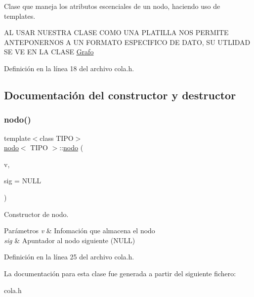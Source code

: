 Clase que maneja los atributos escenciales de un nodo, haciendo uso de templates. 

AL U\+S\+AR N\+U\+E\+S\+T\+RA C\+L\+A\+SE C\+O\+MO U\+NA P\+L\+A\+T\+I\+L\+LA N\+OS P\+E\+R\+M\+I\+TE A\+N\+T\+E\+P\+O\+N\+E\+R\+N\+OS A UN F\+O\+R\+M\+A\+TO E\+S\+P\+E\+C\+I\+F\+I\+CO DE D\+A\+TO, SU U\+T\+L\+I\+D\+AD SE VE EN LA C\+L\+A\+SE \hyperlink{classGrafo}{Grafo} 

Definición en la línea 18 del archivo cola.\+h.



\subsection{Documentación del constructor y destructor}
\mbox{\label{classnodo_ad6c42379673cc2de946e77dacace5155}} 
\subsubsection{\texorpdfstring{nodo()}{nodo()}}
{\footnotesize\ttfamily template$<$class T\+I\+PO$>$ \\
\hyperlink{classnodo}{nodo}$<$ T\+I\+PO $>$\+::\hyperlink{classnodo}{nodo} (\begin{DoxyParamCaption}\item[{T\+I\+PO}]{v,  }\item[{\hyperlink{classnodo}{nodo}$<$ T\+I\+PO $>$ $\ast$}]{sig = {\ttfamily NULL} }\end{DoxyParamCaption})\hspace{0.3cm}{\ttfamily [inline]}}



Constructor de nodo. 


\begin{DoxyParams}{Parámetros}
{\em v} & Infomación que almacena el nodo \\
\hline
{\em sig} & Apuntador al nodo siguiente (N\+U\+LL) \\
\hline
\end{DoxyParams}


Definición en la línea 25 del archivo cola.\+h.



La documentación para esta clase fue generada a partir del siguiente fichero\+:\begin{DoxyCompactItemize}
\item 
cola.\+h\end{DoxyCompactItemize}
